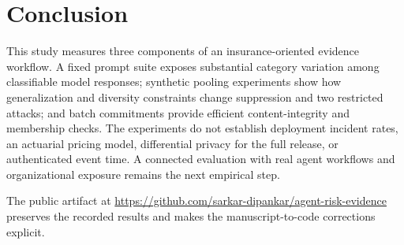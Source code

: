 \section{Conclusion}
\label{sec:conclusion}
This study measures three components of an insurance-oriented evidence workflow. A fixed prompt suite exposes substantial category variation among classifiable model responses; synthetic pooling experiments show how generalization and diversity constraints change suppression and two restricted attacks; and batch commitments provide efficient content-integrity and membership checks. The experiments do not establish deployment incident rates, an actuarial pricing model, differential privacy for the full release, or authenticated event time. A connected evaluation with real agent workflows and organizational exposure remains the next empirical step.

The public artifact at \url{https://github.com/sarkar-dipankar/agent-risk-evidence} preserves the recorded results and makes the manuscript-to-code corrections explicit.
